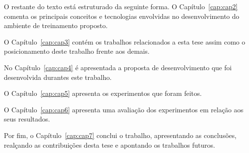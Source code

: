 O restante do texto está estruturado da seguinte forma. O Capítulo~\ref{cap:cap2} comenta os principais conceitos e tecnologias envolvidas no desenvolvimento do ambiente de treinamento proposto.

O Capítulo~\ref{cap:cap3} contém os trabalhos relacionados a esta tese assim como o posicionamento deste trabalho frente aos demais.

No Capítulo~\ref{cap:cap4} é apresentada a proposta de desenvolvimento que foi desenvolvida durantes este trabalho. 

O Capítulo~\ref{cap:cap5} apresenta os experimentos que foram feitos. 

O Capítulo~\ref{cap:cap6} apresenta uma avaliação dos experimentos em relação aos seus resultados.

Por fim, o Capítulo~\ref{cap:cap7} conclui o trabalho, apresentando as conclusões, realçando as contribuições desta tese e apontando os  trabalhos futuros.